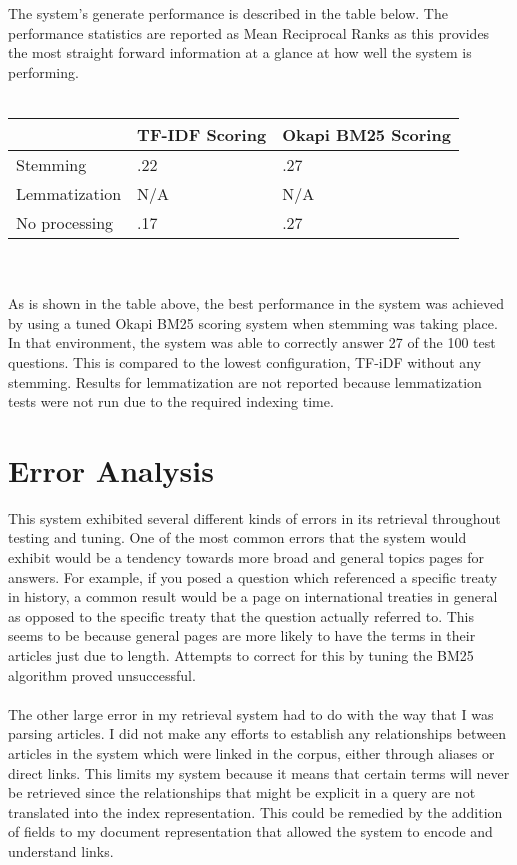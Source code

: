 \documentclass{article}%
\begin{document}
The system's generate performance is described in the table below. The performance statistics are reported as Mean Reciprocal Ranks as
this provides the most straight forward information at a glance at how well the system is performing.\\
\\
\begin{tabular}{| l | l | l |}
    \hline
                    & TF-IDF Scoring    & Okapi BM25 Scoring \\ \hline
    Stemming        & .22               & .27 \\ \hline
    Lemmatization   & N/A               & N/A \\ \hline
    No processing   & .17               & .27 \\ \hline
\end{tabular}\\
\\
As is shown in the table above, the best performance in the system was achieved by using a tuned Okapi BM25 scoring system when stemming
was taking place. In that environment, the system was able to correctly answer 27 of the 100 test questions. This is compared to the
lowest configuration, TF-iDF without any stemming. Results for lemmatization are not reported because lemmatization tests were not run due
to the required indexing time.

\section*{Error Analysis}

This system exhibited several different kinds of errors in its retrieval throughout testing and tuning. One of the most common errors that
the system would exhibit would be a tendency towards more broad and general topics pages for answers. For example, if you posed a question
which referenced a specific treaty in history, a common result would be a page on international treaties in general as opposed to the specific
treaty that the question actually referred to. This seems to be because general pages are more likely to have the terms in their articles just
due to length. Attempts to correct for this by tuning the BM25 algorithm proved unsuccessful.\\
\\
The other large error in my retrieval system had to do with the way that I was parsing articles. I did not make any efforts to establish any
relationships between articles in the system which were linked in the corpus, either through aliases or direct links. This limits my system
because it means that certain terms will never be retrieved since the relationships that might be explicit in a query are not translated
into the index representation. This could be remedied by the addition of fields to my document representation that allowed the system to
encode and understand links.
\end{document}
